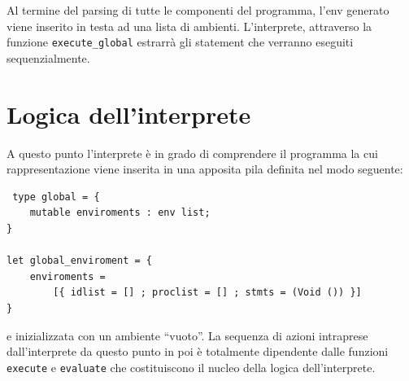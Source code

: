 \documentclass[a4paper,10pt]{article}
\begin{document}
Al termine del parsing di tutte le componenti del programma, l'env generato
viene inserito in testa ad una lista di ambienti. L'interprete, attraverso la
funzione \texttt{execute\_global} estrarr\`a gli statement che verranno
eseguiti sequenzialmente.

\section{Logica dell'interprete}
A questo punto l'interprete \`e in grado di comprendere il programma la cui
rappresentazione viene inserita in una apposita pila definita nel modo seguente:
\begin{verbatim}
 type global = {
    mutable enviroments : env list;
}

let global_enviroment = {
    enviroments =  
        [{ idlist = [] ; proclist = [] ; stmts = (Void ()) }]
}
\end{verbatim}
e inizializzata con un ambiente ``vuoto''. La sequenza di azioni intraprese
dall'interprete da questo punto in poi \`e totalmente dipendente dalle
funzioni \texttt{execute} e \texttt{evaluate} che costituiscono il nucleo della
logica dell'interprete.
\end{document}
